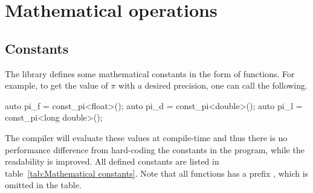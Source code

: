 \chapter{Mathematical operations}
\label{chap:Mathemtical operations}

\section{Constants}
\label{sec:Constants}

The library defines some mathematical constants in the form of
 functions. For example, to get the value of $\pi$ with a
desired precision, one can call the following.
\begin{cppcode}
  auto pi_f = const_pi<float>();
  auto pi_d = const_pi<double>();
  auto pi_l = const_pi<long double>();
\end{cppcode}
The compiler will evaluate these values at compile-time and thus there is no
performance difference from hard-coding the constants in the program, while the
readability is improved. All defined constants are listed in
table~\ref{tab:Mathematical constants}. Note that all functions has a prefix
, which is omitted in the table.

